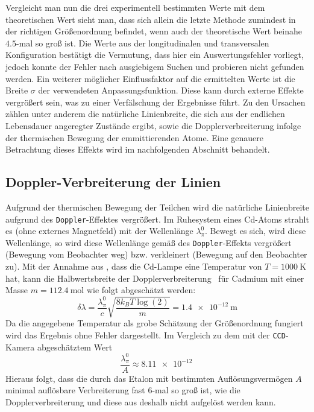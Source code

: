 \noindent Vergleicht man nun die drei experimentell bestimmten Werte mit dem theoretischen Wert sieht man, dass sich allein die letzte Methode zumindest in der richtigen Größenordnung befindet, wenn auch der theoretische Wert beinahe $\num{4.5}$-mal so groß ist. Die Werte aus der longitudinalen und transversalen Konfiguration bestätigt die Vermutung, dass hier ein Auswertungsfehler vorliegt, jedoch konnte der Fehler nach ausgiebigem Suchen und probieren nicht gefunden werden. Ein weiterer möglicher Einflussfaktor auf die ermittelten Werte ist die Breite $\sigma$ der verwendeten Anpassungsfunktion. Diese kann durch externe Effekte vergrößert sein, was zu einer Verfälschung der Ergebnisse führt. Zu den Ursachen zählen unter anderem die natürliche Linienbreite, die sich aus der endlichen Lebensdauer angeregter Zustände ergibt, sowie die Dopplerverbreiterung infolge der thermischen Bewegung der emmittierenden Atome. Eine genauere Betrachtung dieses Effekts wird im nachfolgenden Abschnitt behandelt.
\clearpage
\subsection{Doppler-Verbreiterung der Linien}
Aufgrund der thermischen Bewegung der Teilchen wird die natürliche Linienbreite aufgrund des \texttt{Doppler}-Effektes vergrößert. Im Ruhesystem eines Cd-Atoms strahlt es (ohne externes Magnetfeld) mit der Wellenlänge $\lambda_{\pi}^0$. Bewegt es sich, wird diese Wellenlänge, so wird diese Wellenlänge gemäß des \texttt{Doppler}-Effekts vergrößert (Bewegung vom Beobachter weg) bzw. verkleinert (Bewegung auf den Beobachter zu). Mit der Annahme aus \cite{praktikum4}, dass die Cd-Lampe eine Temperatur von $T = \SI{1000}{\kelvin}$ hat, kann die Halbwertsbreite der Dopplerverbreiterung~\cite{Spektrum} für Cadmium mit einer Masse $m = \SI{112,4}{\mole}$\cite{CIAAW} wie folgt abgeschätzt werden:
\begin{equation*}
    \delta \lambda = \frac{\lambda_{\pi}^0}{c}\sqrt{\frac{8k_B T \log(2)}{m}} = \SI{1.4e-12}{\meter}
\end{equation*}
Da die angegebene Temperatur als grobe Schätzung der Größenordnung fungiert wird das Ergebnis ohne Fehler dargestellt. Im Vergleich zu dem mit der \texttt{CCD}-Kamera abgeschätztem Wert
\begin{equation*}
    \frac{\lambda_{\pi}^0}{A} \approx \SI{8.11e-12}{}
\end{equation*}
Hieraus folgt, dass die durch das Etalon mit bestimmten Auflösungsvermögen $A$ minimal auflösbare Verbreiterung fast 6-mal so groß ist, wie die Dopplerverbreiterung und diese aus deshalb nicht aufgelöst werden kann.